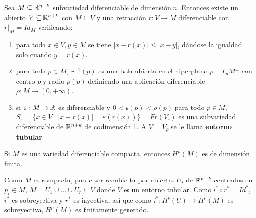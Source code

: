 \documentclass[CV.tex]{subfiles}
\begin{document}
\begin{teorema}

Sea $M\subseteq\mathbb{R}^{n+k}$ subvariedad diferenciable de dimensión $n$. Entonces existe un abierto $V\subseteq\mathbb{R}^{n+k}$ con $M\subseteq V$ y una retracción $r:V\to M$ diferenciable con $r|_M=Id_M$ verificando:
\begin{enumerate}
\item para todo $x\in V, y\in M$ se tiene $|x-r(x)|\leq|x-y|$, dándose la igualdad solo cuando $y=r(x)$. 
\item para todo $p\in M$, $r^{-1}(p)$ es una bola abierta en el hiperplano $p+T_pM^{\perp}$ con centro $p$ y radio $\rho(p)$ definiendo una aplicación diferenciable $\rho:M\to (0,+\infty)$. 
\item si $\varepsilon:M\to\mathbb{R}$ es diferenciable y $0<\varepsilon(p)<\rho(p)$ para todo $p\in M$, $S_{\varepsilon}=\{x\in V\mid |x-r(x)|=\varepsilon(r(x))\}=Fr(V_{\varepsilon})$ es una subvariedad diferenciable de $\mathbb{R}^{n+k}$ de codimensión 1.  A $V=V_\rho$ se le llama \textbf{entorno tubular}.
\end{enumerate}
\end{teorema}


\begin{prop}
Si $M$ es una variedad diferenciable compacta, entonces $H^p(M)$ es de dimensión finita.
\end{prop}
\begin{dem}
Como $M$ es compacta, puede ser recubierta por abiertos $U_i$ de $\mathbb{R}^{n+k}$ centrados en $p_i\in M$, $M=U_1\cup\dots\cup U_r\subseteq V$ donde $V$ es un entorno tubular. Como $i^*\circ r^*=Id^*$, $i^*$ es sobreyectiva y $r^*$ es inyectiva, así que como $i^*:H^p(U)\to H^p(M)$ es sobreyectiva, $H^p(M)$ es finitamente generado. \QED
\end{dem}
\end{document}
